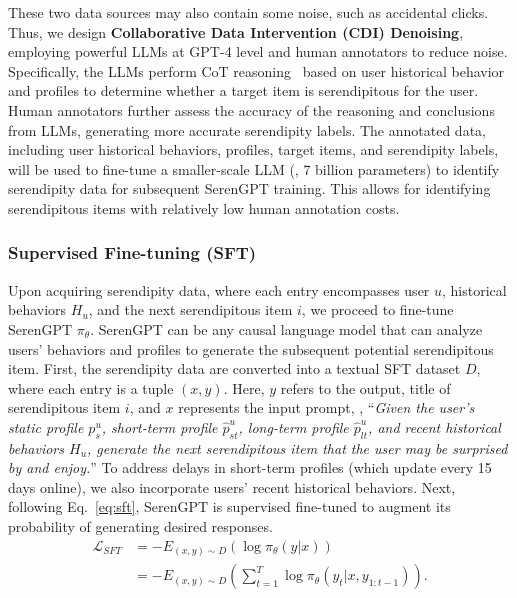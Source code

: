 These two data sources may also contain some noise, such as accidental clicks. Thus, we design \textbf{Collaborative Data Intervention (CDI) Denoising}, employing powerful LLMs at GPT-4 level and human annotators to reduce noise. Specifically, the LLMs perform CoT reasoning~\cite{wei2022chain} based on user historical behavior and profiles to determine whether a target item is serendipitous for the user. Human annotators further assess the accuracy of the reasoning and conclusions from LLMs, generating more accurate serendipity labels. The annotated data, including user historical behaviors, profiles, target items, and serendipity labels, will be used to fine-tune a smaller-scale LLM (\eg, 7 billion parameters) to identify serendipity data for subsequent SerenGPT training. This allows for identifying serendipitous items with relatively low human annotation costs.


\subsubsection{Supervised Fine-tuning (SFT)}\label{sec:sft}

Upon acquiring serendipity data, where each entry encompasses user $u$, historical behaviors $H_u$, and the next serendipitous item $i$, we proceed to fine-tune SerenGPT $\pi_\theta$. SerenGPT can be any causal language model that can analyze users' behaviors and profiles to generate the subsequent potential serendipitous item. First, the serendipity data are converted into a textual SFT dataset $D$, where each entry is a tuple $(x,y)$. Here, $y$ refers to the output, title of serendipitous item $i$, and $x$ represents the input prompt, \eg, ``\textit{Given the user's static profile $p^u_{s}$, short-term profile $\hat{p}^u_{st}$, long-term profile $\hat{p}^u_{lt}$, and recent historical behaviors $H_u$, generate the next serendipitous item that the user may be surprised by and enjoy.}'' To address delays in short-term profiles (which update every 15 days online), we also incorporate users' recent historical behaviors. Next, following Eq.~\eqref{eq:sft}, SerenGPT is supervised fine-tuned to augment its probability of generating desired responses.
\begin{equation}
    \begin{split}
    \mathcal{L}_{SFT}&=-E_{(x, y)\sim D}(\log \pi_\theta(y|x)) \\
    &=-E_{(x, y)\sim D}(\sum^{T}_{t=1}\log \pi_\theta(y_t|x,y_{1:t-1})).
\label{eq:sft}
\end{split}
\end{equation}


